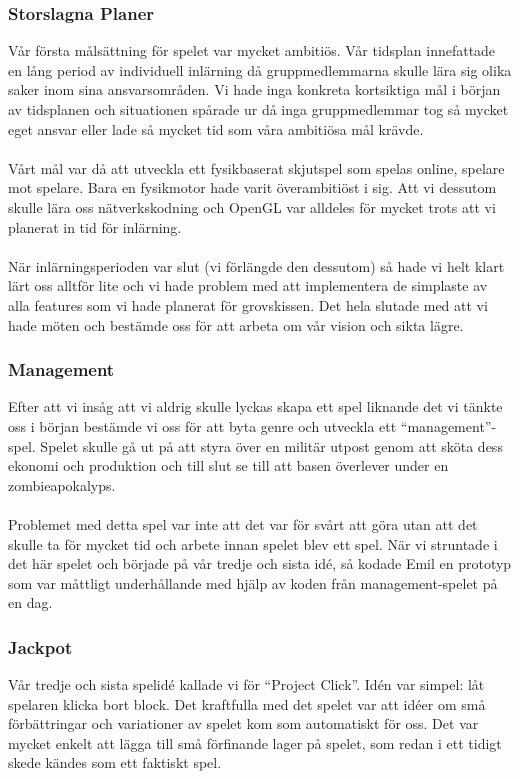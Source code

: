 \documentclass[a4paper]{article}
\begin{document}
\subsubsection{Storslagna Planer}
Vår första målsättning för spelet var mycket ambitiös. Vår tidsplan innefattade en lång period av individuell inlärning då gruppmedlemmarna skulle lära sig olika saker inom sina ansvarsområden. Vi hade inga konkreta kortsiktiga mål i början av tidsplanen och situationen spårade ur då inga gruppmedlemmar tog så mycket eget ansvar eller lade så mycket tid som våra ambitiösa mål krävde.
\\
\\
Vårt mål var då att utveckla ett fysikbaserat skjutspel som spelas online, spelare mot spelare. Bara en fysikmotor hade varit överambitiöst i sig. Att vi dessutom skulle lära oss nätverkskodning och OpenGL var alldeles för mycket trots att vi planerat in tid för inlärning.
\\
\\
När inlärningsperioden var slut (vi förlängde den dessutom) så hade vi helt klart lärt oss alltför lite och vi hade problem med att implementera de simplaste av alla features som vi hade planerat för grovskissen. Det hela slutade med att vi hade möten och bestämde oss för att arbeta om vår vision och sikta lägre.

\subsubsection{Management}
Efter att vi insåg att vi aldrig skulle lyckas skapa ett spel liknande det vi tänkte oss i början bestämde vi oss för att byta genre och utveckla ett “management”-spel. Spelet skulle gå ut på att styra över en militär utpost genom att sköta dess ekonomi och produktion och till slut se till att basen överlever under en zombieapokalyps.
\\
\\
Problemet med detta spel var inte att det var för svårt att göra utan att det skulle ta för mycket tid och arbete innan spelet blev ett spel. När vi struntade i det här spelet och började på vår tredje och sista idé, så kodade Emil en prototyp som var måttligt underhållande med hjälp av koden från management-spelet på en dag.

\subsubsection{Jackpot}
Vår tredje och sista spelidé kallade vi för “Project Click”. Idén var simpel: låt spelaren klicka bort block. Det kraftfulla med det spelet var att idéer om små förbättringar och variationer av spelet kom som automatiskt för oss. Det var mycket enkelt att lägga till små förfinande lager på spelet, som redan i ett tidigt skede kändes som ett faktiskt spel.
\end{document}
